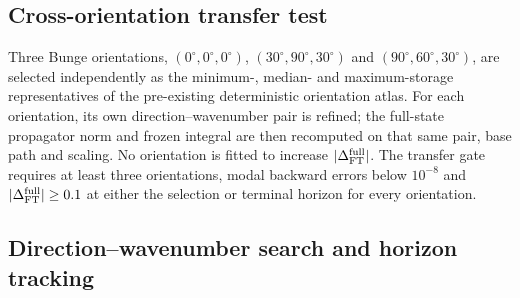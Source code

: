 \subsection{Cross-orientation transfer test}

Three Bunge orientations, $(0^\circ,0^\circ,0^\circ)$, $(30^\circ,90^\circ,30^\circ)$ and $(90^\circ,60^\circ,30^\circ)$, are selected independently as the minimum-, median- and maximum-storage representatives of the pre-existing deterministic orientation atlas. For each orientation, its own direction--wavenumber pair is refined; the full-state propagator norm and frozen integral are then recomputed on that same pair, base path and scaling. No orientation is fitted to increase $|\Delta_{\rm FT}^{\rm full}|$. The transfer gate requires at least three orientations, modal backward errors below $10^{-8}$ and $|\Delta_{\rm FT}^{\rm full}|\ge0.1$ at either the selection or terminal horizon for every orientation.

\subsection{Direction--wavenumber search and horizon tracking}

